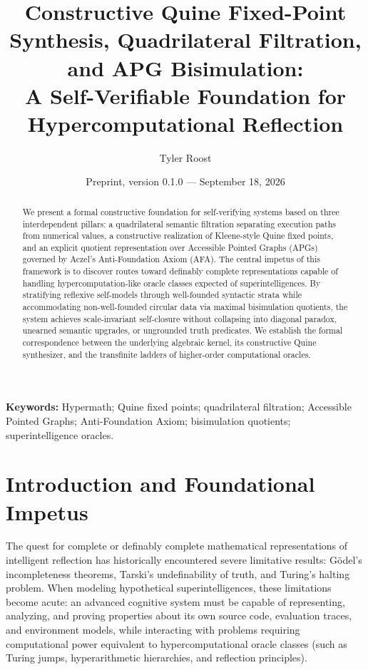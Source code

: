 \documentclass[11pt]{article}
\title{Constructive Quine Fixed-Point Synthesis, Quadrilateral Filtration, and APG Bisimulation:\\A Self-Verifiable Foundation for Hypercomputational Reflection}
\author{Tyler Roost}
\date{Preprint, version 0.1.0 --- September 18, 2026}
\theoremstyle{definition}
\begin{document}
\maketitle

\begin{abstract}
We present a formal constructive foundation for self-verifying systems based on three interdependent pillars: a quadrilateral semantic filtration separating execution paths from numerical values, a constructive realization of Kleene-style Quine fixed points, and an explicit quotient representation over Accessible Pointed Graphs (APGs) governed by Aczel's Anti-Foundation Axiom (AFA). The central impetus of this framework is to discover routes toward definably complete representations capable of handling hypercomputation-like oracle classes expected of superintelligences. By stratifying reflexive self-models through well-founded syntactic strata while accommodating non-well-founded circular data via maximal bisimulation quotients, the system achieves scale-invariant self-closure without collapsing into diagonal paradox, unearned semantic upgrades, or ungrounded truth predicates. We establish the formal correspondence between the underlying algebraic kernel, its constructive Quine synthesizer, and the transfinite ladders of higher-order computational oracles.
\end{abstract}

\noindent\textbf{Keywords:} Hypermath; Quine fixed points; quadrilateral filtration; Accessible Pointed Graphs; Anti-Foundation Axiom; bisimulation quotients; superintelligence oracles.

\section{Introduction and Foundational Impetus}
The quest for complete or definably complete mathematical representations of intelligent reflection has historically encountered severe limitative results: Gödel's incompleteness theorems, Tarski's undefinability of truth, and Turing's halting problem. When modeling hypothetical superintelligences, these limitations become acute: an advanced cognitive system must be capable of representing, analyzing, and proving properties about its own source code, evaluation traces, and environment models, while interacting with problems requiring computational power equivalent to hypercomputational oracle classes (such as Turing jumps, hyperarithmetic hierarchies, and reflection principles).
\end{document}
